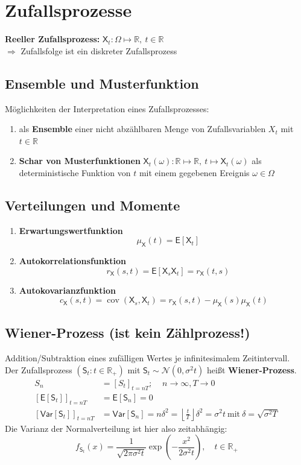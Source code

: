\documentclass[a4paper,twocolumn,10pt]{article}
\DeclareMathOperator{\cov}{cov}
\newenvironment{abc}{\begin{enumerate}[label={\alph*)}]}{\end{enumerate}}
\newcommand{\var}{\mathsf{Var}}
\newcommand{\erw}{\mathsf{E}}
\begin{document}
\section{Zufallsprozesse}
\textbf{Reeller Zufallsprozess:} $\mathsf{X}_{t} : \Omega \mapsto \mathbb{R}, \ t \in \mathbb{R}$\\
$\Rightarrow$ Zufallsfolge ist ein diskreter Zufallsprozess

\subsection{Ensemble und Musterfunktion}
Möglichkeiten der Interpretation eines Zufallsprozesses:
\begin{abc}
\item als \textbf{Ensemble} einer nicht abzählbaren Menge von Zufallsvariablen $X_{t}$ mit $t \in \mathbb{R}$
\item \textbf{Schar von Musterfunktionen} $\mathsf{X}_{t}(\omega) : \mathbb{R} \mapsto \mathbb{R}, \ t \mapsto \mathsf{X}_{t}(\omega)$ als deterministische Funktion von $t$ mit einem gegebenen Ereignis $\omega \in \Omega$
\end{abc}

\subsection{Verteilungen und Momente}
\begin{abc}
\item \textbf{Erwartungswertfunktion} \[  \quad \mu_{\mathsf{X}}(t) = \erw[\mathsf{X}_{t}] \]
\item \textbf{Autokorrelationsfunktion} \[ \quad r_{\mathsf{X}}(s,t) = \erw[\mathsf{X}_{s} \mathsf{X}_{t}]=r_{\mathsf{X}}(t,s) \]
\item \textbf{Autokovarianzfunktion}  \[ c_{\mathsf{X}}(s,t) = \cov(\mathsf{X}_{s}, \mathsf{X}_{t}) =  r_{\mathsf{X}}(s,t) - \mu_{\mathsf{X}}(s) \mu_{\mathsf{X}}(t) \]
\end{abc}

\subsection{Wiener-Prozess (ist \textbf{kein} Zählprozess!)}
Addition/Subtraktion eines zufälligen Wertes je infinitesimalem Zeitintervall.  \\
Der Zufallsprozess $(\mathsf{S}_{t} : t \in \mathbb{R}_{+})$ mit  $\mathsf{S}_{t} \sim \mathcal{N} (0, \sigma^{2} t)$ heißt \textbf{Wiener-Prozess}.
\begin{align}
S_n&=[S_t]_{t=nT};\;\;\;\;n\rightarrow\infty,T\rightarrow 0\nonumber\\
\left[\erw[\mathsf{S}_{t}]\right]_{t=nT} & = \erw[\mathsf{S}_{n}] = 0 \nonumber \\
\left[\var[\mathsf{S}_{t}]\right]_{t=nT} & = \var[\mathsf{S}_{n}] = n \delta^{2} = \left\lfloor \frac{t}{T} \right\rfloor \delta^{2}=\sigma^2t \ \text{mit} \ \delta = \sqrt{\sigma^{2}T} \nonumber
\end{align}
Die Varianz der Normalverteilung ist hier also zeitabhängig:
\[ f_{\mathsf{S}_{t}}(x) = \frac{1}{\sqrt{2\pi \sigma^{2} t}} \operatorname{exp}\left(-\frac{x^{2}}{2\sigma^{2}t} \right) , \quad t \in \mathbb{R}_{+}\]
\end{document}
